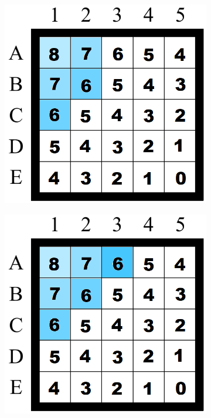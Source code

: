 \begin{figure}[H]
\begin{subfigure}[b]{.3\textwidth}
\end{subfigure}
\begin{subfigure}[b]{.3\textwidth}
  \centering
  \includegraphics[width=0.95\linewidth]{Report/Part2/g tie breaker/smaller g/3.png}  
\end{subfigure}
\newline
\linebreak
\begin{subfigure}[b]{.3\textwidth}
  \centering
  \includegraphics[width=0.95\linewidth]{Report/Part2/g tie breaker/smaller g/4.png}  

\end{subfigure}
\end{figure}
